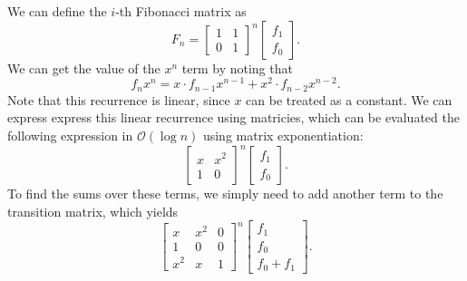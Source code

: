 \documentclass{article}
\begin{document}
We can define the $i$-th Fibonacci matrix as $$F_n=\begin{bmatrix}1&1\\0&1\end{bmatrix}^n\begin{bmatrix}f_1\\f_0\end{bmatrix}.$$We can get the value of the $x^n$ term by noting that $$f_nx^n = x\cdot f_{n-1}x^{n-1}+x^2\cdot f_{n-2}x^{n-2}.$$ Note that this recurrence is linear, since $x$ can be treated as a constant. We can express express this linear recurrence using matricies, which can be evaluated the following expression in $\mathcal{O}(\log n)$ using matrix exponentiation:$$\begin{bmatrix}x&x^2\\1&0\end{bmatrix}^n\begin{bmatrix}f_1\\f_0\end{bmatrix}.$$To find the sums over these terms, we simply need to add another term to the transition matrix, which yields $$\begin{bmatrix}x&x^2&0\\1&0&0\\x^2&x&1\end{bmatrix}^n\begin{bmatrix}f_1\\f_0\\f_0+f_1\end{bmatrix}.$$
\end{document}
